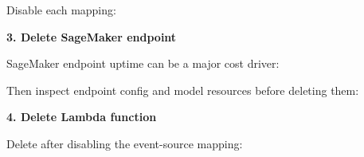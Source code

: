 Disable each mapping:

\begin{Shaded}
\begin{Highlighting}[]
\DataTypeTok{\textbackslash{}}
   \OperatorTok{\textless{}}\OperatorTok{\textgreater{}} \DataTypeTok{\textbackslash{}}
  \DataTypeTok{\textbackslash{}}
\end{Highlighting}
\end{Shaded}

\vspace{0.5em}\noindent\textbf{3. Delete SageMaker
endpoint}\par

SageMaker endpoint uptime can be a major cost driver:

\begin{Shaded}
\begin{Highlighting}[]
\DataTypeTok{\textbackslash{}}
  \DataTypeTok{\textbackslash{}}
\end{Highlighting}
\end{Shaded}

Then inspect endpoint config and model resources before deleting them:

\begin{Shaded}
\begin{Highlighting}[]
\end{Highlighting}
\end{Shaded}

\vspace{0.5em}\noindent\textbf{4. Delete Lambda function}\par

Delete after disabling the event-source mapping:

\begin{Shaded}
\begin{Highlighting}[]
\DataTypeTok{\textbackslash{}}
  \DataTypeTok{\textbackslash{}}
\end{Highlighting}
\end{Shaded}

